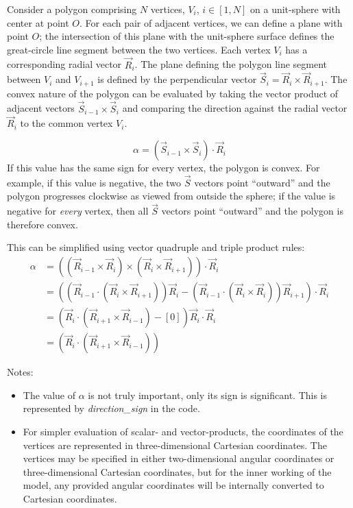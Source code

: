\documentclass[11pt,fleqn]{report}
\begin{document}
Consider a polygon comprising $N$ vertices, $V_i$, $i \in [1,N]$ on a
unit-sphere with center at point $O$. For each pair of adjacent vertices,
we can define a plane with point $O$; the intersection of this plane with
the unit-sphere surface defines the great-circle line segment between the
two vertices. Each vertex $V_i$ has a corresponding radial vector
$\vec R_i$. The plane defining the polygon line segment between $V_i$ and
$V_{i+1}$ is defined by the perpendicular vector
$\vec S_i = \vec R_i \times \vec R_{i+1}$. The convex nature of the polygon
can be evaluated by taking the vector product of adjacent vectors
$\vec S_{i-1} \times \vec S_{i}$ and comparing the direction against the
radial vector $\vec R_i$ to the common vertex $V_i$.

\begin{equation*}
  \alpha = \left( \vec S_{i-1} \times \vec S_{i} \right) \cdot \vec R_i
\end{equation*}
If this value has the same sign for every vertex, the polygon is convex. For
example, if this value is negative, the two $\vec S$ vectors point ``outward''
and the polygon progresses clockwise as viewed from outside the sphere;
if the value is negative for \textit{every} vertex, then all $\vec S$
vectors point ``outward'' and the polygon is therefore convex.

This can be simplified using vector quadruple and triple product rules:
\begin{align*}
 \alpha & = \left( \left( \vec R_{i-1} \times \vec R_{i} \right) \times
                   \left( \vec R_{i} \times \vec R_{i+1} \right)
            \right)
            \cdot \vec R_i \\
 {} &= \left( \left( \vec R_{i-1} \cdot
                     \left( \vec R_{i} \times \vec R_{i+1} \right)
              \right) \vec R_i -
              \left( \vec R_{i-1} \cdot
                     \left( \vec R_{i} \times \vec R_{i} \right)
              \right) \vec R_{i+1}
       \right) \cdot \vec R_i  \\
 {} &= \left( \vec R_{i} \cdot \left( \vec R_{i+1} \times \vec R_{i-1} \right) -
              [0]
       \right) \vec R_i \cdot \vec R_i  \\
 {} &= \left( \vec R_{i} \cdot
              \left( \vec R_{i+1} \times \vec R_{i-1} \right)
       \right)
\end{align*}

Notes:
\begin{itemize}
  \item The value of $\alpha$ is not truly important, only its sign is
    significant. This is represented by \textit{direction\_sign} in the code.
  \item For simpler evaluation of scalar- and vector-products,
    the coordinates of the vertices are represented in three-dimensional
    Cartesian coordinates. The vertices may be specified in either
    two-dimensional angular coordinates or three-dimensional Cartesian
    coordinates, but for the inner working of the model, any provided
    angular coordinates will be internally converted to Cartesian coordinates.
\end{itemize}
\end{document}
